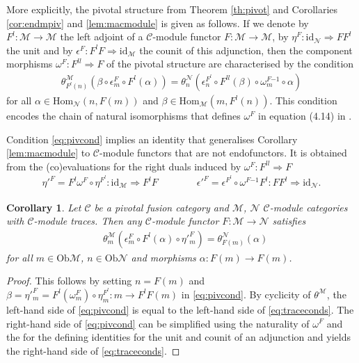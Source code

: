 \documentclass[1.5pt, a4paper]{article}
\newcommand{\mac}{\mathcal C}
\newcommand{\mam}{\mathcal M}
\newcommand{\man}{\mathcal N}
\newcommand{\Hom}{\mathrm{Hom}}
\newcommand{\Ob}{\mathrm{Ob}}
\newcommand{\inv}[0]{{-1}}
\newcommand{\id}[0]{\mathrm{id}}
\newtheorem{corollary}[theorem]{Corollary}
\begin{document}
More explicitly, the pivotal structure from Theorem \ref{th:pivot} and Corollaries \ref{cor:endmpiv} and \ref{lem:macmodule} is given as follows. If we denote by $F^l: \mam\to\mam$ the left adjoint of a $\mac$-module functor $F:\mam\to\mam$, by $\eta^F: \id_\man\Rightarrow FF^l$ the unit and  by $\epsilon^F:F^lF\Rightarrow \id_\mam$ the counit of this adjunction,
 then the component morphisms
 $\omega^F: F^{ll}\Rightarrow F$ of the pivotal structure are characterised by the condition
\begin{align}
\label{eq:pivcond}
\theta^\mam_{F^l(n)}(\beta\circ\epsilon^F_m\circ F^l(\alpha))=\theta^\man_n (\epsilon^{F^l}_n\circ F^{ll}(\beta)\circ\omega^{F\inv}_m \circ \alpha)
\end{align}
for all $\alpha\in \Hom_\man(n, F(m))$ and $\beta\in \Hom_\mam(m, F^l(n))$. This condition encodes the chain of natural isomorphisms that defines $\omega^F$  in equation (4.14) in \cite{G12}.

Condition \eqref{eq:pivcond} implies an identity that  generalises Corollary \ref{lem:macmodule} to $\mac$-module functors that are not endofunctors. 
It is obtained from the (co)evaluations for the right duals  induced by  $\omega^F: F^{ll}\Rightarrow F$
\begin{align}\label{eq	:etaprime}\eta'^{F}=F^l\omega^F\circ \eta^{F^l}:\id_\mam\Rightarrow F^lF\qquad\qquad \epsilon'^F= \epsilon^{F^l}\circ \omega^{F\inv}F^l:FF^l \Rightarrow \id_\man.
\end{align} 

 

\begin{corollary}\label{cor:functortrace} Let $\mac$ be a pivotal fusion category and $\mam$, $\man$ $\mac$-module categories with $\mac$-module traces. Then any $\mac$-module functor $F:\mam\to\man$ satisfies
\begin{align}\label{eq:traceconds}
&\theta^\mam_m(\epsilon^{F}_m\circ F^l(\alpha)\circ \eta'^F_m)=\theta^\man_{F(m)}(\alpha)
\end{align}
for all $m\in\Ob\mam$, $n\in\Ob\man$ and morphisms $\alpha: F(m)\to F(m)$.
\end{corollary}

\begin{proof}
This follows by setting $n=F(m)$ and $\beta=\eta'^F_m=F^l(\omega^F_m)\circ \eta^{F^l}_m: m\to F^lF(m)$ in \eqref{eq:pivcond}. By cyclicity of $\theta^\mam$, the left-hand side of  \eqref{eq:pivcond} is  equal to the left-hand side of \eqref{eq:traceconds}. The right-hand side of \eqref{eq:pivcond} can  be simplified using the naturality of  $\omega^F$ and the for the defining identities for the unit and counit of an adjunction and yields the right-hand side of \eqref{eq:traceconds}. 
\end{proof}
\end{document}
